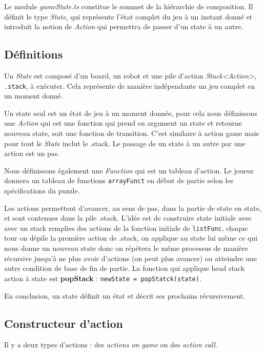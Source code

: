 Le module \textit{gameState.ts} constitue le sommet de la hiérarchie de composition. Il définit le type \textit{State}, qui représente l'état complet du jeu à un instant donné et introduit la notion de \textit{Action} qui permettra de passer d’un state à un autre.

\subsection{Définitions}

Un \textit{State} est composé d’un board, un robot et une pile d’action \textit{Stack<Action>}, \texttt{.stack}, à exécuter. Cela représente de manière indépendante un jeu complet en un moment donné.

Un state seul est un état de jeu à un moment donnée, pour cela nous définissons une \textit{Action} qui est une fonction qui prend en argument un state et retourne nouveau state, soit une fonction de transition. C'est similaire à action game mais pour tout le \textit{State} inclut le .stack. Le passage de un state à un autre par une action est un pas. 

Nous définissons également une \textit{Function} qui est un tableau d'action. Le joueur donnera un tableau de functions \texttt{arrayFunct} en début de partie selon les spécifications du puzzle.

Les actions permettent d’avancer, au sens de pas, dans la partie de state en state, et sont contenues dans la pile .stack. L’idée est de construire state initiale avec avec un stack remplies des actions de la fonction initiale de \texttt{listFunc}, chaque tour on dépile la première action de .stack, on applique au state lui même ce qui nous donne un nouveau state donc on répétera le même processus de manière récursive jusqu’à ne plus avoir d’actions (on peut plus avancer) ou atteindre une autre condition de base de fin de partie. La fonction qui applique head stack action à state est \textbf{popStack} : \texttt{newState = popStatck(state)}.

En conclusion, un state définit un état et décrit ses prochains récursivement.

\subsection{Constructeur d’action}

Il y a deux types d’actions : des \textit{actions on game} ou des \textit{action call}.
\\

